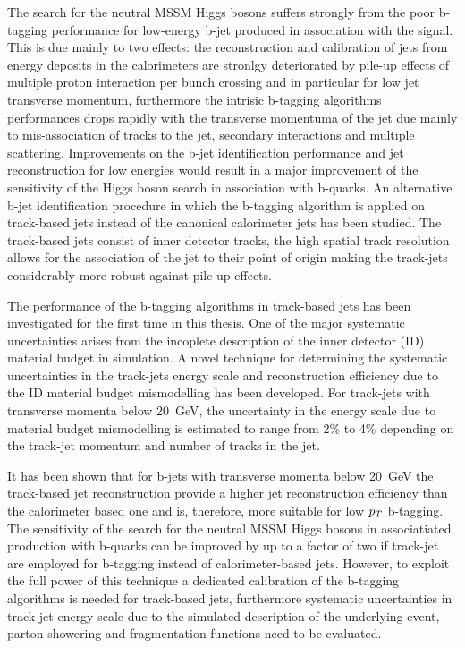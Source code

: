 The search for the neutral MSSM Higgs bosons suffers  strongly from the 
poor b-tagging performance for  low-energy b-jet produced in association 
with the signal. This is due mainly to two effects:
the reconstruction and calibration of jets from energy deposits in the calorimeters are stronlgy 
deteriorated by pile-up effects of multiple proton interaction per bunch crossing and 
in particular for low jet transverse momentum, furthermore the intrisic b-tagging algorithms 
performances drops rapidly with the transverse momentuma of the jet due mainly to mis-association of 
tracks to the jet, secondary interactions and multiple scattering.
Improvements on the b-jet identification performance and jet reconstruction for low energies would result 
in a major improvement of the sensitivity of the Higgs boson search in association with b-quarks.
An alternative b-jet identification procedure in which the b-tagging algorithm is applied on 
track-based jets instead of the  canonical calorimeter jets has been studied.
The track-based jets consist of inner detector tracks, the high spatial track resolution
allows for the association of the jet to their point of origin making the track-jets 
considerably more robust against pile-up effects.

The performance of the b-tagging algorithms in track-based jets has been investigated for the first time in this thesis.
One of the major systematic uncertainties arises from the incoplete description of the inner detector (ID) material
 budget in simulation.
A novel technique for determining the systematic uncertainties in the track-jets energy scale and
reconstruction efficiency  due to the ID material budget mismodelling  has been developed. 
For track-jets with transverse momenta below 20~GeV, the  uncertainty  in the energy scale  due to 
material budget mismodelling is estimated to range from 2\% to 4\% depending on the track-jet 
momentum and number of  tracks in the jet.

It has been shown that for b-jets with transverse momenta below 20~GeV the track-based jet reconstruction provide a higher
jet reconstruction efficiency than the calorimeter based one and is, therefore, more suitable  for
low $p_{T}$ b-tagging. The sensitivity of the search for the neutral MSSM Higgs bosons
in associatiated production with b-quarks can be improved by
 up to a factor of two if track-jet are employed for b-tagging instead of  calorimeter-based jets.
However, to exploit the full power of this technique a dedicated calibration of the 
b-tagging algorithms is  needed for  track-based jets, furthermore systematic uncertainties
in track-jet energy scale due to the simulated description of the underlying event, parton showering
and fragmentation functions need to be evaluated.














